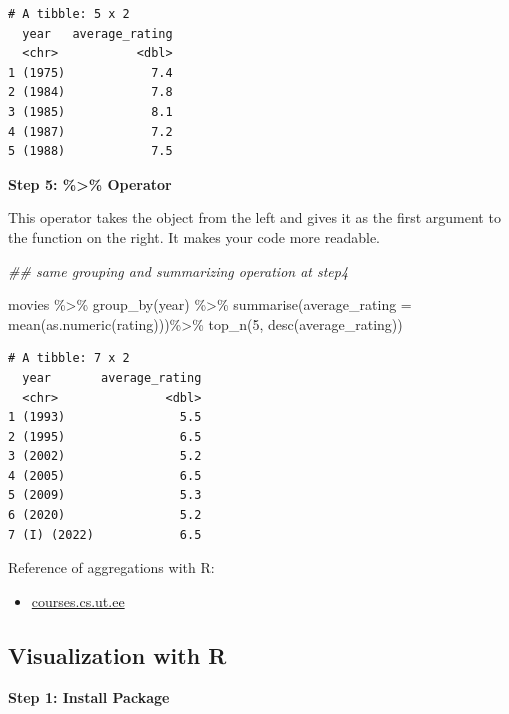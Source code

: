 \documentclass[
  letterpaper,
  DIV=11,
  numbers=noendperiod]{scrreprt}
\newenvironment{Shaded}{\begin{snugshade}}{\end{snugshade}}
\newcommand{\AttributeTok}[1]{\textcolor[rgb]{0.40,0.45,0.13}{#1}}
\newcommand{\DecValTok}[1]{\textcolor[rgb]{0.68,0.00,0.00}{#1}}
\newcommand{\DocumentationTok}[1]{\textcolor[rgb]{0.37,0.37,0.37}{\textit{#1}}}
\newcommand{\FunctionTok}[1]{\textcolor[rgb]{0.28,0.35,0.67}{#1}}
\newcommand{\NormalTok}[1]{\textcolor[rgb]{0.00,0.23,0.31}{#1}}
\newcommand{\SpecialCharTok}[1]{\textcolor[rgb]{0.37,0.37,0.37}{#1}}
\providecommand{\tightlist}{%
  \setlength{\itemsep}{0pt}\setlength{\parskip}{0pt}}\usepackage{longtable,booktabs,array}
\begin{document}
\begin{verbatim}
# A tibble: 5 x 2
  year   average_rating
  <chr>           <dbl>
1 (1975)            7.4
2 (1984)            7.8
3 (1985)            8.1
4 (1987)            7.2
5 (1988)            7.5
\end{verbatim}

\textbf{Step 5: \%\textgreater\% Operator}

This operator takes the object from the left and gives it as the first
argument to the function on the right. It makes your code more readable.

\begin{Shaded}
\begin{Highlighting}[]
\DocumentationTok{\#\# same grouping and summarizing operation at step4 }

\NormalTok{movies }\SpecialCharTok{\%\textgreater{}\%}
  \FunctionTok{group\_by}\NormalTok{(year) }\SpecialCharTok{\%\textgreater{}\%}
  \FunctionTok{summarise}\NormalTok{(}\AttributeTok{average\_rating =} \FunctionTok{mean}\NormalTok{(}\FunctionTok{as.numeric}\NormalTok{(rating)))}\SpecialCharTok{\%\textgreater{}\%}
  \FunctionTok{top\_n}\NormalTok{(}\DecValTok{5}\NormalTok{, }\FunctionTok{desc}\NormalTok{(average\_rating))}
\end{Highlighting}
\end{Shaded}

\begin{verbatim}
# A tibble: 7 x 2
  year       average_rating
  <chr>               <dbl>
1 (1993)                5.5
2 (1995)                6.5
3 (2002)                5.2
4 (2005)                6.5
5 (2009)                5.3
6 (2020)                5.2
7 (I) (2022)            6.5
\end{verbatim}

Reference of aggregations with R:

\begin{itemize}
\tightlist
\item
  \href{https://courses.cs.ut.ee/MTAT.03.183/2017_fall/uploads/Main/dplyr.html}{courses.cs.ut.ee}
\end{itemize}

\hypertarget{visualization-with-r}{%
\subsection{Visualization with R}\label{visualization-with-r}}

\textbf{Step 1: Install Package}
\end{document}
